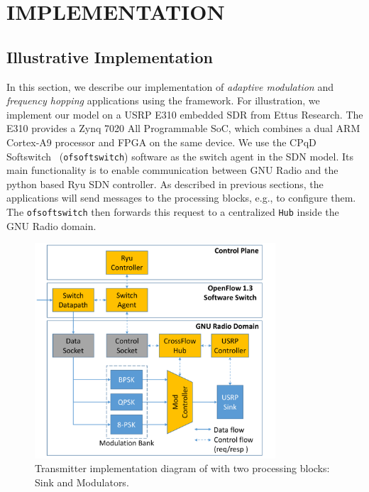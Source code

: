 \chapter{\uppercase {\crossflowcap Implementation}}
\label{sec:evaluation}

\section{Illustrative \crossflow Implementation}

In this section, we describe our implementation of \emph{adaptive modulation} and \emph{frequency hopping} applications using the \crossflow framework. For illustration, we implement our model on a USRP E310 embedded SDR from Ettus Research. The E310 provides a Zynq 7020 All Programmable SoC, which combines a dual ARM Cortex-A9 processor and FPGA on the same device. We use the CPqD Softswitch~\cite{ofsoftswitch13} (\texttt{ofsoftswitch}) software as the switch agent in the SDN model. Its main functionality is to enable communication between GNU Radio and the python based Ryu SDN controller. As described in previous sections, the applications will send messages to the processing blocks, e.g., to configure them. The \texttt{ofsoftswitch} then forwards this request to a centralized \texttt{\crossflow Hub} inside the GNU Radio domain. 

\begin{figure}[t]
  \centering
  \includegraphics[width=0.8\textwidth]{figures/Flowgraph.pdf}
  \caption{Transmitter implementation diagram of \crossflow with two processing blocks: Sink and Modulators.}
  \label{fig:flowgraph}
\end{figure}

